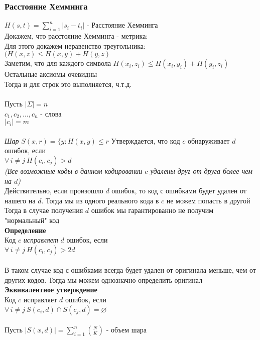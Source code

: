 \documentclass[12pt]{article}
\begin{document}
\subsubsection{Расстояние Хемминга}
$H(s,t) = \sum_{i=1}^n |s_i - t_i|$ - Расстояние Хемминга\\
Докажем, что расстояние Хемминга - метрика:\\
Для этого докажем неравенство треугольника:\\
$(H(x,z) \leq H(x,y) + H(y,z)$\\
Заметим, что для каждого символа
$H(x_i, z_i) \leq H(x_i, y_i) + H(y_i, z_i)$\\
Остальные аксиомы очевидны\\
Тогда и для строк это выполняется, ч.т.д.\\\\
Пусть $|\Sigma| = n$\\
$c_1,c_2,\ldots,c_n$ - слова\\
$|c_i| = m$\\\\
\textit{Шар} $S(x,r) = \{ y: H(x,y) \leq r$
Утверждается, что код $c$ обнаруживает $d$ ошибок, если\\
$\forall\,i\neq j\ H(c_i, c_j) > d$\\
\textit{(Все возможные коды в данном кодировании $c$ удалены друг от друга более чем на $d$)}\\
Действительно, если произошло $d$ ошибок, то код с ошибками будет удален от нашего на $d$. Тогда мы из одного реального кода в $c$ не можем попасть в другой\\
Тогда в случае получения $d$ ошибок мы гарантированно не получим "нормальный" код\\
\textbf{Определение}\\
Код $c$ \textit{исправляет} $d$ ошибок, если\\
$\forall\,i\neq j\ H(c_i, c_j) > 2d$\\\\
В таком случае код с ошибками всегда будет удален от оригинала меньше, чем от других кодов. Тогда мы можем однозначно определить оригинал\\
\textbf{Эквивалентное утверждение}\\
Код $c$ исправляет $d$ ошибок, если\\
$\forall\,i\neq j\ S(c_i,d) \cap S(c_j, d) = \varnothing$\\\\
Пусть $|S(x,d)| = \sum_{i=1}^n \binom{N}{K}$ - объем шара\\
\end{document}
